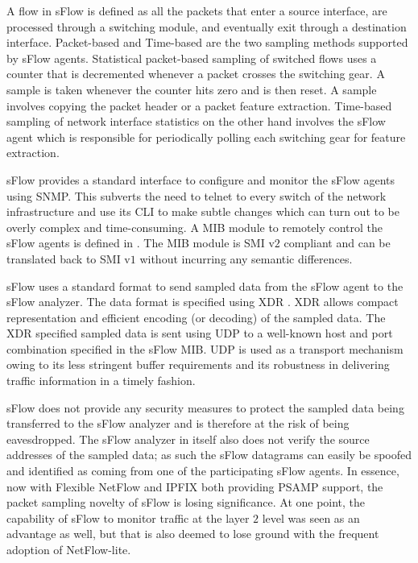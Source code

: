 A flow in sFlow is defined as all the packets that enter a source interface, are processed through a switching module, and eventually exit through a destination interface. Packet-based and Time-based are the two sampling methods supported by sFlow agents. Statistical packet-based sampling of switched flows uses a  counter that is decremented whenever a packet crosses the switching gear. A sample is taken whenever the counter hits zero and is then reset. A sample involves copying the packet header or a packet feature extraction. Time-based sampling of network interface statistics on the other hand involves the sFlow agent which is responsible for periodically polling each switching gear for feature extraction.

sFlow provides a standard interface to configure and monitor the sFlow agents using \ac{SNMP}. This subverts the need to telnet to every switch of the network infrastructure and use its \ac{CLI}  to make subtle changes which can turn out to be overly complex and time-consuming. A \ac{MIB} module to remotely control the sFlow agents is defined in \cite{rfc3176}. The \ac{MIB} module is \ac{SMI} v$2$ compliant and can be translated back to \ac{SMI} v$1$ without incurring any semantic differences.

sFlow uses a standard format to send sampled data from the sFlow agent to the sFlow analyzer. The data format is specified using \ac{XDR} \cite{rfc1014}. \ac{XDR} allows compact representation and efficient encoding (or decoding) of the sampled data. The  \ac{XDR} specified sampled data is sent using \ac{UDP} to a well-known host and port combination specified in the sFlow \ac{MIB}. \ac{UDP} is used as a transport mechanism owing to its less stringent buffer requirements and its robustness in delivering traffic information in a timely fashion.  

sFlow does not provide any security measures to protect the sampled data being transferred to the sFlow analyzer and is therefore at the risk of being eavesdropped. The sFlow analyzer in itself also does not verify the source addresses of the sampled data; as such the sFlow datagrams can easily be spoofed and identified as coming from  one of the participating sFlow agents. In essence, now with Flexible NetFlow and \ac{IPFIX} both providing \ac{PSAMP} support, the packet sampling novelty of sFlow is losing significance. At one point, the capability of sFlow to monitor traffic at the layer $2$ level was seen as an advantage as well, but that is also deemed to lose ground with the frequent adoption of NetFlow-lite.